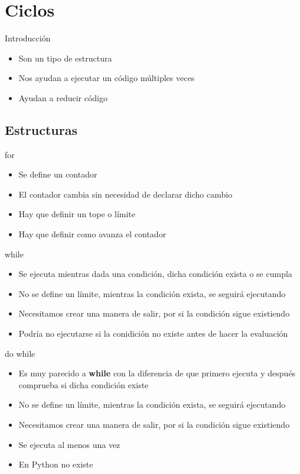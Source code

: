 \documentclass{beamer}
\begin{document}
\section{Ciclos}

\begin{frame}{Introducci\'on}
    \begin{itemize}
        \item Son un tipo de estructura
        \item Nos ayudan a ejecutar un c\'odigo m\'ultiples veces
        \item Ayudan a reducir c\'odigo
    \end{itemize}
\end{frame}

\subsection{Estructuras}

\begin{frame}{for}
    \begin{itemize}
        \item Se define un contador
        \item El contador cambia sin necesidad de declarar dicho cambio
        \item Hay que definir un tope o l\'imite
        \item Hay que definir como avanza el contador
    \end{itemize}
\end{frame}


\begin{frame}{while}
    \begin{itemize}
        \item Se ejecuta mientras dada una condici\'on, dicha condici\'on exista o se cumpla
        \item No se define un l\'imite, mientras la condici\'on exista, se seguir\'a ejecutando 
        \item Necesitamos crear una manera de salir, por si la condici\'on sigue existiendo
        \item Podr\'ia no ejecutarse si la conidici\'on no existe antes de hacer la evaluaci\'on
    \end{itemize}
\end{frame}

\begin{frame}{do while}
    \begin{itemize}
            \item Es muy parecido a \textbf{while} con la diferencia de que primero ejecuta y despu\'es comprueba si dicha condici\'on existe
            \item No se define un l\'imite, mientras la condici\'on exista, se seguir\'a ejecutando
            \item Necesitamos crear una manera de salir, por si la condici\'on sigue existiendo
            \item Se ejecuta al menos una vez
            \item En Python no existe
        \end{itemize}
\end{frame}
\end{document}
